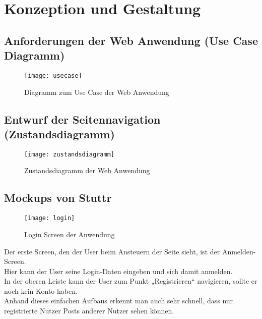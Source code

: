 \chapter{Konzeption und Gestaltung}

  \section{Anforderungen der Web Anwendung (Use Case Diagramm)}
      \begin{figure}[!htb]
        \begin{center}
          \texttt{[image: usecase]}
          \caption{Diagramm zum Use Case der Web Anwendung}
          \label{fig:Use Case Diagramm}
        \end{center}
      \end{figure}

\newpage
  \section{Entwurf der Seitennavigation (Zustandsdiagramm)}
      \begin{figure}[!htb]
        \begin{center}
          \texttt{[image: zustandsdiagramm]}
          \caption{Zustandsdiagramm der Web Anwendung}
          \label{fig:Zustandsdiagramm}
        \end{center}
      \end{figure}

\newpage
  \section{Mockups von Stuttr}
      \begin{figure}[!htb]
        \begin{center}
            \texttt{[image: login]}
          \caption{Login Screen der Anwendung}
          \label{fig:login}
        \end{center}
      \end{figure}

    Der erste Screen, den der User beim Ansteuern der Seite sieht, ist der Anmelden-Screen. \\
    Hier kann der User seine Login-Daten eingeben und sich damit anmelden. \\
    In der oberen Leiste kann der User zum Punkt „Registrieren“ navigieren, sollte er noch kein Konto haben. \\
    Anhand dieses einfachen Aufbaus erkennt man auch sehr schnell, dass nur registrierte Nutzer Posts anderer Nutzer sehen können.

